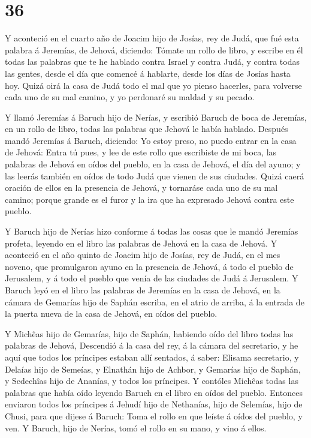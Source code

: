 \hypertarget{section-35}{%
\section{36}\label{section-35}}

 Y aconteció en el cuarto año de Joacim hijo de Josías, rey
de Judá, que fué esta palabra á Jeremías, de Jehová, diciendo:
 Tómate un rollo de libro, y escribe en él todas las
palabras que te he hablado contra Israel y contra Judá, y contra todas
las gentes, desde el día que comencé á hablarte, desde los días de
Josías hasta hoy.  Quizá oirá la casa de Judá todo el mal
que yo pienso hacerles, para volverse cada uno de su mal camino, y yo
perdonaré su maldad y su pecado.

 Y llamó Jeremías á Baruch hijo de Nerías, y escribió Baruch
de boca de Jeremías, en un rollo de libro, todas las palabras que Jehová
le había hablado.  Después mandó Jeremías á Baruch,
diciendo: Yo estoy preso, no puedo entrar en la casa de Jehová:
 Entra tú pues, y lee de este rollo que escribiste de mi
boca, las palabras de Jehová en oídos del pueblo, en la casa de Jehová,
el día del ayuno; y las leerás también en oídos de todo Judá que vienen
de sus ciudades.  Quizá caerá oración de ellos en la
presencia de Jehová, y tornaráse cada uno de su mal camino; porque
grande es el furor y la ira que ha expresado Jehová contra este pueblo.

 Y Baruch hijo de Nerías hizo conforme á todas las cosas que
le mandó Jeremías profeta, leyendo en el libro las palabras de Jehová en
la casa de Jehová.  Y aconteció en el año quinto de Joacim
hijo de Josías, rey de Judá, en el mes noveno, que promulgaron ayuno en
la presencia de Jehová, á todo el pueblo de Jerusalem, y á todo el
pueblo que venía de las ciudades de Judá á Jerusalem.  Y
Baruch leyó en el libro las palabras de Jeremías en la casa de Jehová,
en la cámara de Gemarías hijo de Saphán escriba, en el atrio de arriba,
á la entrada de la puerta nueva de la casa de Jehová, en oídos del
pueblo.

 Y Michêas hijo de Gemarías, hijo de Saphán, habiendo oído
del libro todas las palabras de Jehová,  Descendió á la
casa del rey, á la cámara del secretario, y he aquí que todos los
príncipes estaban allí sentados, á saber: Elisama secretario, y Delaías
hijo de Semeías, y Elnathán hijo de Achbor, y Gemarías hijo de Saphán, y
Sedechîas hijo de Ananías, y todos los príncipes.  Y
contóles Michêas todas las palabras que había oído leyendo Baruch en el
libro en oídos del pueblo.  Entonces enviaron todos los
príncipes á Jehudí hijo de Nethanías, hijo de Selemías, hijo de Chusi,
para que dijese á Baruch: Toma el rollo en que leíste á oídos del
pueblo, y ven. Y Baruch, hijo de Nerías, tomó el rollo en su mano, y
vino á ellos.

